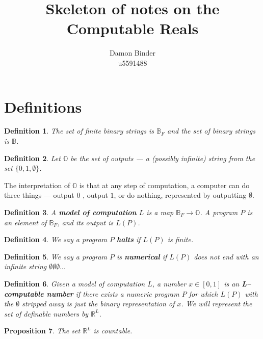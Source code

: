 \documentclass[11pt]{article}
\theoremstyle{plain}
\newtheorem{prop}{Proposition}[section]
\newtheorem{defn}[prop]{Definition}
\newcommand{\bb}[1]{\mathbb{#1}}
\newcommand{\bo}[1]{{\bf #1}}
\begin{document}
\title{Skeleton of notes on the Computable Reals}
\author{Damon Binder \\
u5591488}
\maketitle

\section{Definitions}

\begin{defn} The set of finite binary strings is $\bb B_F$ and the set of binary strings is $\bb B$.\end{defn}

\begin{defn} Let $\bb O$ be the set of outputs --- a (possibly infinite) string from the set $\{0,1,\emptyset\}$.\end{defn}

The interpretation of $\bb O$ is that at any step of computation, a computer can do three things --- output $0$
, output $1$, or do nothing, represented by outputting $\emptyset$.

\begin{defn} A \bo{model of computation} $L$ is a map $\bb B_F \rightarrow \bb O$. A program $P$ is an element of $\bb B_F$, and its output is $L(P)$.\end{defn}

\begin{defn} We say a program $P$ \bo{halts} if $L(P)$ is finite.\end{defn}

\begin{defn} We say a program $P$ is \bo{numerical} if $L(P)$ does not end with an infinite string $\emptyset\emptyset\emptyset...$ \end{defn}

\begin{defn} Given a model of computation $L$, a number $x\in[0,1]$ is an \bo{L--computable number} if there exists a numeric program $P$ for which $L(P)$ with the $\emptyset$ stripped away is just the binary representation of $x$. We will represent the set of definable numbers by $\bb R^L$.\end{defn}

\begin{prop} The set $\bb R^L$ is countable. \end{prop}
\end{document}
